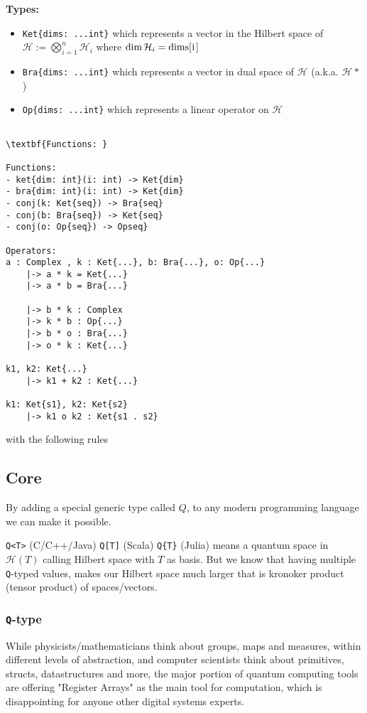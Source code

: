 \documentclass[a4paper,11pt]{article}
\def\co{\lstinline}
\begin{document}
\textbf{Types: }
\begin{itemize}
	\item \co|Ket{dims: ...int}| which represents a vector in the Hilbert space of $\mathcal{H} := \bigotimes_{i = 1}^n \mathcal{H}_i$ where $\dim \mathcal{H}_i = \text{\co|dims[i]|}$
    \item \co|Bra{dims: ...int}| which represents a vector in dual space of $\mathcal{H}$ (a.k.a. $\mathcal{H}*$)
    \item \co|Op{dims: ...int}| which represents a linear operator on $\mathcal{H}$
\end{itemize}
\begin{lstlisting}

\textbf{Functions: }

Functions:
- ket{dim: int}(i: int) -> Ket{dim}
- bra{dim: int}(i: int) -> Ket{dim}
- conj(k: Ket{seq}) -> Bra{seq}
- conj(b: Bra{seq}) -> Ket{seq}
- conj(o: Op{seq}) -> Opseq}

Operators:
a : Complex , k : Ket{...}, b: Bra{...}, o: Op{...}
    |-> a * k = Ket{...}
    |-> a * b = Bra{...}

    |-> b * k : Complex
    |-> k * b : Op{...}
    |-> b * o : Bra{...}
    |-> o * k : Ket{...}
    
k1, k2: Ket{...}
    |-> k1 + k2 : Ket{...}

k1: Ket{s1}, k2: Ket{s2}
    |-> k1 o k2 : Ket{s1 . s2}
\end{lstlisting}
with the following rules

\subsection{Core}

By adding a special generic type called $Q$, to any modern programming language we can make it possible.

\co{Q<T>} (C/C++/Java) \co{Q[T]} (Scala) \co|Q{T}| (Julia) means a quantum space in $\mathcal{H}(T)$ calling Hilbert space with $T$ as basis. But we know that having multiple \co{Q}-typed values, makes our Hilbert space much larger that is kronoker product (tensor product) of spaces/vectors.

\subsubsection{\co|Q|-type}
While physicists/mathematicians think about groups, maps and measures, within different levels of abstraction, and computer scientists think about primitives, structs, datastructures and more, the major portion of quantum computing tools are offering "Register Arrays" as the main tool for computation, which is disappointing for anyone other digital systems experts.
\end{document}
